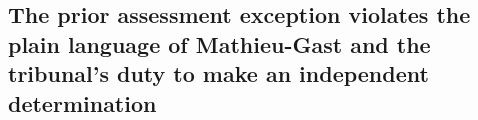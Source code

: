 \documentclass[12pt,\documentclassflag]{michiganCourtOfAppealsBrief}
\begin{document}



\subsection{The prior assessment exception violates the plain language of Mathieu-Gast and the tribunal's duty to make an independent determination}
\end{document}
